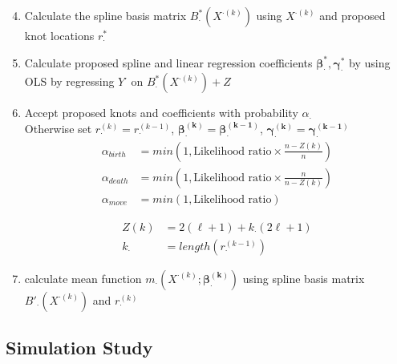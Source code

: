 \documentclass[handout]{beamer}\usepackage[]{graphicx}\usepackage[]{color}
\begin{document}
\begin{frame}

\begin{enumerate}
\setcounter{enumi}{3}
\small
\item
Calculate the spline basis matrix $B^*_{\cdot}(X^{\cdot(k)})$ using $X^{\cdot(k)}$ and proposed knot locations $r_{\cdot}^{*}$

\item
Calculate proposed spline and linear regression coefficients $\boldsymbol{\beta^*_{\cdot}},\boldsymbol{\gamma^*_{\cdot}}$ by using OLS by regressing $Y^{\cdot}$ on $B^*_{\cdot}(X^{\cdot(k)}) + Z$

\item
Accept proposed knots and coefficients with probability $\alpha_{\cdot}$ \\

Otherwise set $r_{\cdot}^{(k)}=r_{\cdot}^{(k-1)}$, $\boldsymbol{\beta^{(k)}_{\cdot}} =\boldsymbol{\beta^{(k-1)}_{\cdot}}$, $\boldsymbol{\gamma^{(k)}_{\cdot}} =\boldsymbol{\gamma^{(k-1)}_{\cdot}}$\\

\begin{align*}
\alpha_{birth} &= min\left(1, \text{Likelihood ratio}\times \frac{n-Z(k)}{n} \right) \\
\alpha_{death} &= min\left(1, \text{Likelihood ratio}\times \frac{n}{n-Z(k)} \right) \\
\alpha_{move} &= min\left(1, \text{Likelihood ratio}\right) 
\end{align*}

\begin{align*}
Z(k) &= 2(\ell+1) + k_{\cdot}(2\ell+1) \\
k_{\cdot} &= length(r_{\cdot}^{(k-1)}) 
\end{align*}

\item
calculate mean function $m_{\cdot}(X^{\cdot(k)};\boldsymbol{\beta^{(k)}_{\cdot}})$ using spline basis matrix $B'_{\cdot}(X^{\cdot(k)})$ and $r_{\cdot}^{(k)}$


\end{enumerate}

\end{frame}

\subsection{Simulation Study}
\end{document}
